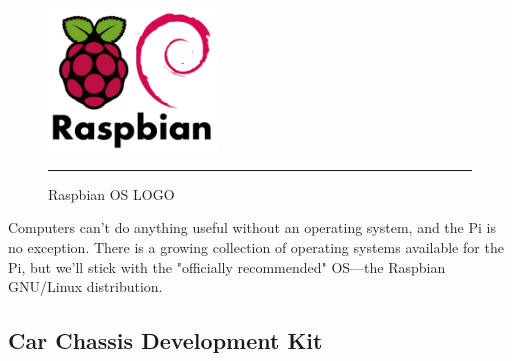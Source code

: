 \begin{figure}
\vspace{-25pt}
  \begin{center}
    \includegraphics[width=0.4\textwidth]{./Pictures/raspbian.png}
    \rule{0.4\textwidth}{1pt}
        \caption{Raspbian OS LOGO}
  \end{center}
\end{figure}
\hfill \break
Computers can't do anything useful without an operating system, and the Pi is
no exception. There is a growing collection of operating systems available for
the Pi, but we'll stick with the "officially recommended" OS—the Raspbian
GNU/Linux distribution.\cite{12}
\clearpage

\subsection{Car Chassis Development Kit} 

